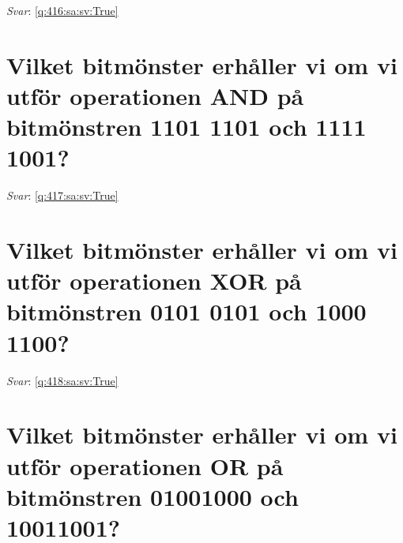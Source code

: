 \documentclass[a4paper,11pt,oneside]{book}
\begin{document}
\begin{sloppypar}
\label{q:416:sa:sv:False}

\vspace{2cm}

\noindent\makebox[\textwidth]{\hrulefill}

\vspace{1cm}

\textit{Svar}: \autoref{q:416:sa:sv:True}



\section{Vilket bitm\"onster erh\r{a}ller vi om vi utf\"or operationen AND p\r{a} bitm\"onstren 1101 1101 och 1111 1001?}

\label{q:417:sa:sv:False}

\vspace{2cm}

\noindent\makebox[\textwidth]{\hrulefill}

\vspace{1cm}

\textit{Svar}: \autoref{q:417:sa:sv:True}



\section{Vilket bitm\"onster erh\r{a}ller vi om vi utf\"or operationen XOR p\r{a} bitm\"onstren 0101 0101 och 1000 1100?}

\label{q:418:sa:sv:False}

\vspace{2cm}

\noindent\makebox[\textwidth]{\hrulefill}

\vspace{1cm}

\textit{Svar}: \autoref{q:418:sa:sv:True}



\section{Vilket bitm\"onster erh\r{a}ller vi om vi utf\"or operationen OR p\r{a} bitm\"onstren 01001000 och 10011001?}

\label{q:419:sa:sv:False}

\vspace{2cm}

\noindent\makebox[\textwidth]{\hrulefill}

\vspace{1cm}


\end{sloppypar}
\end{document}
